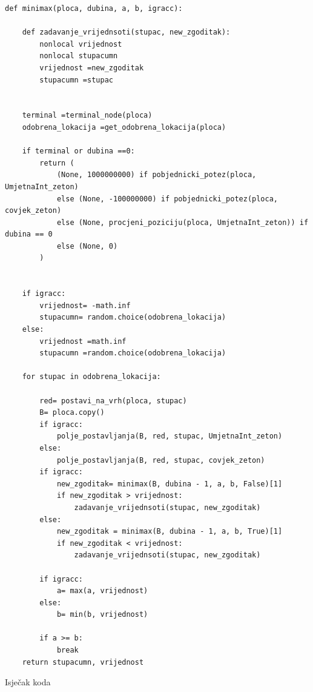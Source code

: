 \documentclass[]{foi}
\begin{document}
\begin{listing}
    \begin{verbatim}
def minimax(ploca, dubina, a, b, igracc):
    
    def zadavanje_vrijednsoti(stupac, new_zgoditak):
        nonlocal vrijednost
        nonlocal stupacumn
        vrijednost =new_zgoditak
        stupacumn =stupac
        
    
    terminal =terminal_node(ploca)
    odobrena_lokacija =get_odobrena_lokacija(ploca)
  
    if terminal or dubina ==0:
        return (
            (None, 1000000000) if pobjednicki_potez(ploca, UmjetnaInt_zeton)
            else (None, -100000000) if pobjednicki_potez(ploca, covjek_zeton)
            else (None, procjeni_poziciju(ploca, UmjetnaInt_zeton)) if dubina == 0
            else (None, 0)
        )

    
    if igracc:
        vrijednost= -math.inf
        stupacumn= random.choice(odobrena_lokacija)
    else:
        vrijednost =math.inf
        stupacumn =random.choice(odobrena_lokacija)
        
    for stupac in odobrena_lokacija:
            
        red= postavi_na_vrh(ploca, stupac)
        B= ploca.copy()
        if igracc:
            polje_postavljanja(B, red, stupac, UmjetnaInt_zeton)
        else:
            polje_postavljanja(B, red, stupac, covjek_zeton)
        if igracc:
            new_zgoditak= minimax(B, dubina - 1, a, b, False)[1]
            if new_zgoditak > vrijednost:
                zadavanje_vrijednsoti(stupac, new_zgoditak)
        else:
            new_zgoditak = minimax(B, dubina - 1, a, b, True)[1]
            if new_zgoditak < vrijednost:
                zadavanje_vrijednsoti(stupac, new_zgoditak)
       
        if igracc:
            a= max(a, vrijednost)
        else: 
            b= min(b, vrijednost)

        if a >= b:
            break
    return stupacumn, vrijednost
    \end{verbatim}
    \caption{Isječak koda}
    \label{lst:dva}
\end{listing}
\end{document}
